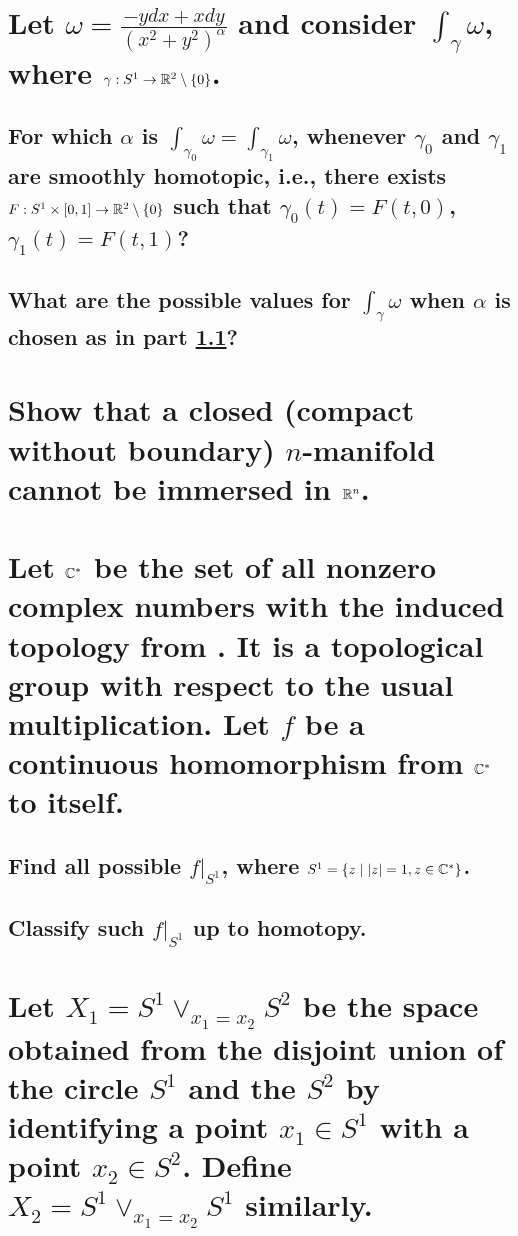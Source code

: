 \documentclass[10pt]{article}
\begin{document}
\section{Let $\omega = \frac{-y dx + x dy}{(x^2 + y^2)^\alpha} $ and consider $\int_\gamma \omega$,
  where $\gamma : S^1 \to \mathbb{R}^2 \setminus \left\{ 0 \right\} $.}

\subsection{For which $\alpha$ is $\int_{\gamma_0} \omega = \int_{\gamma_1} \omega$, whenever
  $\gamma_0$ and $\gamma_1$ are smoothly homotopic, i.e., there exists $F:S^1 \times [0,1] \to
  \mathbb{R}^2\setminus \left\{ 0 \right\}$ such that $\gamma_0(t) = F(t,0)$, $\gamma_1(t) = F(t,1)$?}
  \label{cre}

\subsection{What are the possible values for $\int_\gamma \omega$ when $\alpha$ is chosen as in part
  \ref{cre}?}

\section{Show that a closed (compact without boundary) $n$-manifold cannot be immersed in
  $\mathbb{R}^n$.}

\section{Let $\mathbb{C}^*$ be the set of all nonzero complex numbers with the induced topology from
  \C. It is a topological group with respect to the usual multiplication. Let $f$ be a
  continuous homomorphism from $\mathbb{C}^*$ to itself.}

\subsection{Find all possible $f|_{S^1}$, where $S^1 = \left\{ z \mid |z| = 1, z \in \mathbb{C}^*
  \right\} $.}

\subsection{Classify such $f|_{S^1}$ up to homotopy.}

\section{Let $X_1 = S^1 \vee_{x_1 = x_2} S^2$ be the space obtained from the disjoint union of the
  circle $S^1$ and the $S^2$ by identifying a point $x_1 \in S^1$ with a point $x_2 \in S^2$. Define
  $X_2 = S^1 \vee_{x_1 = x_2} S^1$ similarly.}
\end{document}
